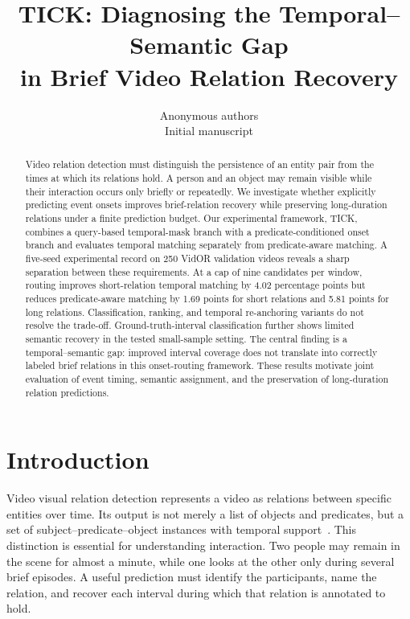\documentclass[10pt,twocolumn,letterpaper]{article}
\title{TICK: Diagnosing the Temporal--Semantic Gap\\in Brief Video Relation Recovery}
\author{Anonymous authors\\Initial manuscript}
\begin{document}
\maketitle

\begin{abstract}
Video relation detection must distinguish the persistence of an entity pair from the times at which its relations hold. A person and an object may remain visible while their interaction occurs only briefly or repeatedly. We investigate whether explicitly predicting event onsets improves brief-relation recovery while preserving long-duration relations under a finite prediction budget. Our experimental framework, TICK, combines a query-based temporal-mask branch with a predicate-conditioned onset branch and evaluates temporal matching separately from predicate-aware matching. A five-seed experimental record on 250 VidOR validation videos reveals a sharp separation between these requirements. At a cap of nine candidates per window, routing improves short-relation temporal matching by 4.02 percentage points but reduces predicate-aware matching by 1.69 points for short relations and 5.81 points for long relations. Classification, ranking, and temporal re-anchoring variants do not resolve the trade-off. Ground-truth-interval classification further shows limited semantic recovery in the tested small-sample setting. The central finding is a temporal--semantic gap: improved interval coverage does not translate into correctly labeled brief relations in this onset-routing framework. These results motivate joint evaluation of event timing, semantic assignment, and the preservation of long-duration relation predictions.
\end{abstract}

\section{Introduction}
Video visual relation detection represents a video as relations between specific entities over time. Its output is not merely a list of objects and predicates, but a set of subject--predicate--object instances with temporal support~\cite{shang2017video,shang2019annotating}. This distinction is essential for understanding interaction. Two people may remain in the scene for almost a minute, while one looks at the other only during several brief episodes. A useful prediction must identify the participants, name the relation, and recover each interval during which that relation is annotated to hold.
\end{document}
